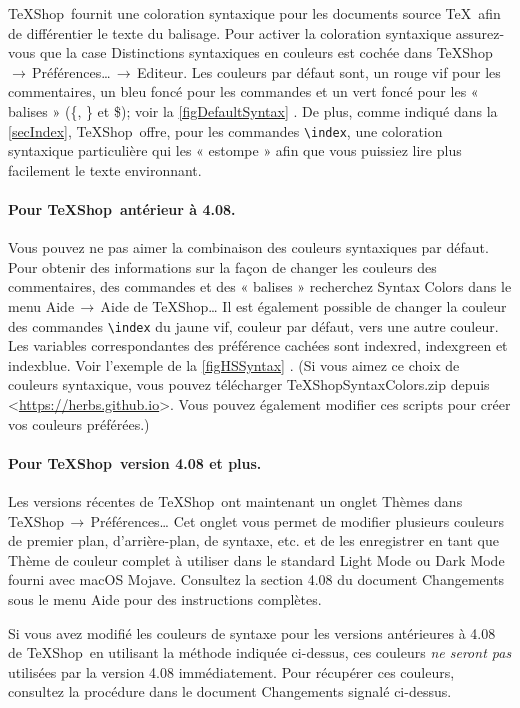 \documentclass[11pt,french]{article}
\newcommand{\TS}{\textsf{\TeX Shop}}
\newcommand{\cmd}[1]{\textsf{#1}}
\newcommand{\mnu}[1]{\textsf{#1}}
\newcommand{\To}{\,\(\to\)\,}
\begin{document}
\TS\ fournit une coloration syntaxique pour les documents source \TeX\ afin de différentier le texte du balisage. Pour activer la coloration syntaxique assurez-vous que la case \mnu{Distinctions syntaxiques en couleurs} est cochée dans \mnu{TeXShop}\To\mnu{Préférences…}\To\mnu{Editeur}. Les couleurs par défaut sont, un rouge vif pour les commentaires, un bleu foncé pour les commandes et un vert foncé pour les « balises » (\cmd{\{}, \cmd{\}} et \cmd{\$}); voir la \cref{figDefaultSyntax} . De plus, comme indiqué dans la \cref{secIndex}, \TS\ offre, pour les commandes \verb+\index+, une coloration syntaxique particulière qui les « estompe » afin que vous puissiez lire plus facilement le texte environnant.

\paragraph{Pour \TS\ antérieur à 4.08.}
Vous pouvez ne pas aimer la combinaison des couleurs syntaxiques par défaut. Pour obtenir des informations sur la façon de changer les couleurs des commentaires, des commandes et des « balises » recherchez \cmd{Syntax Colors} dans le menu \mnu{Aide}\To\mnu{Aide de TeXShop…} Il est également possible de changer la couleur des commandes \verb+\index+ du jaune vif, couleur par défaut, vers une autre couleur. Les variables correspondantes des préférence cachées sont \cmd{indexred}, \cmd{indexgreen} et \cmd{indexblue}. Voir l'exemple de la \cref{figHSSyntax} . (Si vous aimez ce choix de couleurs syntaxique, vous pouvez télécharger \cmd{TeXShopSyntaxColors.zip} depuis <\url{https://herbs.github.io}>. Vous pouvez également modifier ces scripts pour créer vos couleurs préférées.)

\paragraph{Pour \TS\ version 4.08 et plus.}
Les versions récentes de \TS\ ont maintenant un onglet \cmd{Thèmes} dans \mnu {\TS}\To\mnu{Préférences…} Cet onglet vous permet de modifier plusieurs couleurs de premier plan, d'arrière-plan, de syntaxe, etc. et de les enregistrer en tant que Thème de couleur complet à utiliser dans le standard Light Mode ou Dark Mode fourni avec \cmd{macOS Mojave}. Consultez la section 4.08 du document \cmd{Changements} sous le menu \mnu{Aide} pour des instructions complètes.

Si vous avez modifié les couleurs de syntaxe pour les versions antérieures à 4.08 de \TS\ en utilisant la méthode indiquée ci-dessus, ces couleurs \emph{ne seront pas} utilisées par la version 4.08 immédiatement. Pour récupérer ces couleurs, consultez la procédure dans le document \cmd{Changements} signalé ci-dessus.
\end{document}
